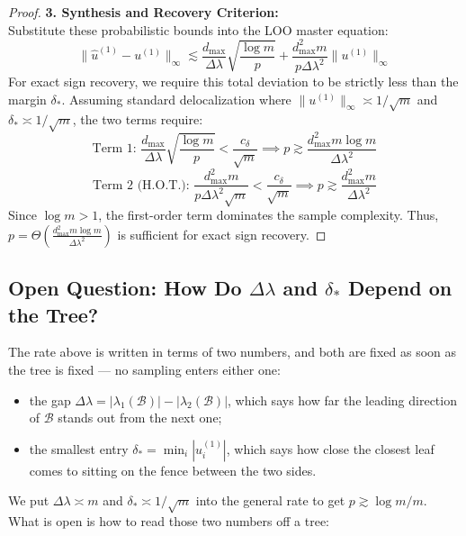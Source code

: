 \documentclass[11pt]{article}
\begin{document}
\begin{proof}
\textbf{3. Synthesis and Recovery Criterion:} \\
Substitute these probabilistic bounds into the LOO master equation:
\begin{equation}
\|\hat{u}^{(1)} - u^{(1)}\|_\infty \lesssim \frac{d_{\max}}{\Delta\lambda} \sqrt{\frac{\log m}{p}} + \frac{d_{\max}^2 m}{p \Delta\lambda^2} \|u^{(1)}\|_\infty
\end{equation}
For exact sign recovery, we require this total deviation to be strictly less than the margin $\delta_*$. Assuming standard delocalization where $\|u^{(1)}\|_\infty \asymp 1/\sqrt{m}$ and $\delta_* \asymp 1/\sqrt{m}$, the two terms require:
\begin{equation}
\text{Term 1: } \frac{d_{\max}}{\Delta\lambda} \sqrt{\frac{\log m}{p}} < \frac{c_\delta}{\sqrt{m}} \implies p \gtrsim \frac{d_{\max}^2 m \log m}{\Delta\lambda^2}
\end{equation}
\begin{equation}
\text{Term 2 (H.O.T.): } \frac{d_{\max}^2 m}{p \Delta\lambda^2 \sqrt{m}} < \frac{c_\delta}{\sqrt{m}} \implies p \gtrsim \frac{d_{\max}^2 m}{\Delta\lambda^2}
\end{equation}
Since $\log m > 1$, the first-order term dominates the sample complexity. Thus, $p = \Theta\left( \frac{d_{\max}^2 m \log m}{\Delta\lambda^2} \right)$ is sufficient for exact sign recovery. 
\end{proof}

\subsection{Open Question: How Do $\Delta\lambda$ and $\delta_*$ Depend on the Tree?}

The rate above is written in terms of two numbers, and both are fixed as soon as the tree
is fixed --- no sampling enters either one:
\begin{itemize}
\item the gap $\Delta\lambda = |\lambda_1(\mathcal{B})| - |\lambda_2(\mathcal{B})|$, which
says how far the leading direction of $\mathcal{B}$ stands out from the next one;
\item the smallest entry $\delta_* = \min_i |u^{(1)}_i|$, which says how close the closest
leaf comes to sitting on the fence between the two sides.
\end{itemize}
We put $\Delta\lambda \asymp m$ and $\delta_* \asymp 1/\sqrt{m}$ into the general rate to
get $p \gtrsim \log m / m$. What is open is how to read those two numbers off a tree:
\end{document}
